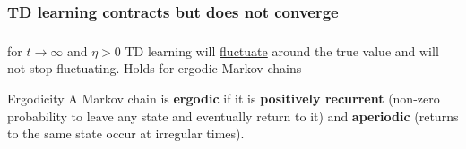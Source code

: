\begin{frame}
\begin{itemize}
{\begin{itemize}
		\end{itemize}
		}
	
	\end{itemize}

\end{frame}

\newpage

\subsubsection{TD learning contracts but does not converge}

\begin{frame}\frametitle{\subsecname}

 for $t\rightarrow \infty$ and $\eta > 0$ TD learning will \underline{fluctuate} around the true value
and will not stop fluctuating. Holds for ergodic Markov chains

	\begin{block}{Ergodicity}
		A Markov chain is \textbf{ergodic} if it is
		\textbf{positively recurrent} 
		(non-zero probability to leave any state and 
		eventually return to it) and \textbf{aperiodic} 
		(returns to the same state occur at irregular times).
	\end{block}
	
	\slidesonly{
	\vspace{5mm}
	}
	
	

\end{frame}

